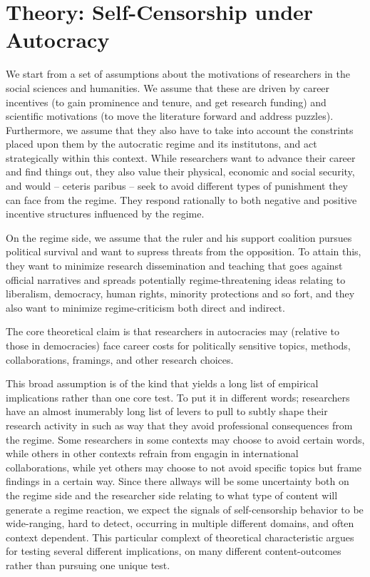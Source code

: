 \documentclass[12pt,a4paper]{article}
\begin{document}
\section{Theory: Self-Censorship under Autocracy}
\label{sec:theory}
We start from a set of assumptions about the motivations of researchers in the social sciences and humanities. We assume that these are driven by career incentives (to gain prominence and tenure, and get research funding) and scientific motivations (to move the literature forward and address puzzles). Furthermore, we assume that they also have to take into account the constrints placed upon them by the autocratic regime and its institutons, and act strategically within this context. While researchers want to advance their career and find things out, they also value their physical, economic and social security, and would -- ceteris paribus -- seek to avoid different types of punishment they can face from the regime. They respond rationally to both negative and positive incentive structures influenced by the regime. 

On the regime side, we assume that the ruler and his support coalition pursues political survival and want to supress threats from the opposition. To attain this, they want to minimize research dissemination and teaching that goes against official narratives and spreads potentially regime-threatening ideas relating to liberalism, democracy, human rights, minority protections and so fort, and they also want to minimize regime-criticism both direct and indirect.

The core theoretical claim is that researchers in autocracies may (relative to those in democracies) face
career costs for politically sensitive topics, methods, collaborations,
framings, and other research choices.

This broad assumption is of the kind that yields a long list of empirical implications rather than one core test. To put it in different words; researchers have an almost inumerably long list of levers to pull to subtly shape their research activity in such as way that they avoid professional consequences from the regime. Some researchers in some contexts may choose to avoid certain words, while others in other contexts refrain from engagin in international collaborations, while yet others may choose to not avoid specific topics but frame findings in a certain way. Since there allways will be some uncertainty both on the regime side and the researcher side relating to what type of content will generate a regime reaction, we expect the signals of self-censorship behavior to be wide-ranging, hard to detect, occurring in multiple different domains, and often context dependent. This particular complext of theoretical characteristic argues for testing several different implications, on many different content-outcomes rather than pursuing one unique test. 
\end{document}
